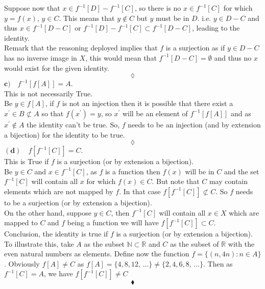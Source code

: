 Suppose now that $x\in f^{-1}[D]-f^{-1}[C]$, so there is no $x \in f^{-1}[C]$ for which $y=f(x),\, y\in C$. This means that $y\not \in C$ but  $y$ must be in $D$. i.e. $y\in D-C$ and thus $x\in f^{-1}[D-C]$ or $f^{-1}[D]-f^{-1}[C]\subset f^{-1}[D-C]$, leading to the identity.\\
 Remark that the reasoning deployed implies that $f$ is a surjection as if $y\in D-C$ has no inverse image in $X$, this would mean that  $f^{-1}[D-C]=\emptyset$ and thus no $x$ would exist for the given identity.
$$\lozenge$$
$\mathbf{c)}\quad f^{-1}[f[A]] = A$. \\
This is not necessarily True.\\
Be $y\in f[A]$, if $f$ is not an injection then it is possible that there exist a $x^{'}\in B \not\subset A$ so that $f(x^{'})=y$, so $x^{'}$ will be an element of $f^{-1}[f[A]]$ and as $x^{'}\not\in  A$ the identity can't be true. So, $f$ needs to be an injection (and by extension a bijection) for the identity to be true.
$$\lozenge$$
$\mathbf{(d)}\quad f[f^{-1}[C]] = C$. \\
This is True if $f$ is a surjection (or by extension a bijection).\\
Be $y\in C$ and  $x\in f^{-1}[C]$, as $f$ is a function then $f(x)$ will be in $C$ and  the set $f^{-1}[C]$ will contain all $x$ for which  $f(x)\in C$. But note that $C$ may contain elements which are not mapped by $f$. In that case $ f[f^{-1}[C]] \not \subset C$. So $f$ needs to be a surjection (or by extension a bijection).\\
On the other hand, suppose $y\in C$, then $f^{-1}[C]$ will contain all $x\in X$ which are mapped to $C$ and $f$ being a function  we will have $f[f^{-1}[C]]\subset C$.\\
Conclusion, the identity is true if $f$ is a surjection (or by extension a bijection).\\
To illustrate this, take $A$ as the subset $\mathbb{N}\subset \mathbb{R}$ and $C$ as the subset of $\mathbb{R}$ with the even natural numbers as elements. Define now the function $f=\{(n,4n): n\in A\}$. Obviously $f[A] \ne C $ as $f[A]=\{4,8,12,\,\dots\}\ne \{2,4,6,8,\,\dots\}$. Then as $f^{-1}[C] = A$, we have  $f[f^{-1}[C]] \ne C$
$$\blacklozenge$$


